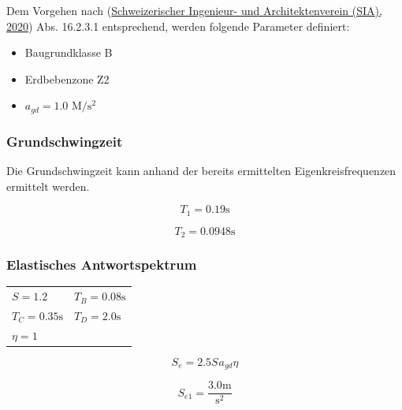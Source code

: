\documentclass[
  letterpaper,
  DIV=11]{scrreprt}
\providecommand{\tightlist}{%
  \setlength{\itemsep}{0pt}\setlength{\parskip}{0pt}}\usepackage{longtable,booktabs,array}
\begin{document}
Dem Vorgehen nach (\protect\hyperlink{ref-SIA261_2020}{Schweizerischer
Ingenieur- und Architektenverein (SIA), 2020}) Abs. 16.2.3.1
entsprechend, werden folgende Parameter definiert:

\begin{itemize}
\tightlist
\item
  Baugrundklasse B
\item
  Erdbebenzone Z2
\item
  \(a_{gd} = 1.0 \text{ M}/\text{s}^2\)
\end{itemize}

\hypertarget{grundschwingzeit-1}{%
\subsubsection{Grundschwingzeit}\label{grundschwingzeit-1}}

Die Grundschwingzeit kann anhand der bereits ermittelten
Eigenkreisfrequenzen ermittelt werden.

\begin{equation}T_{1} = 0.19 \text{s}\end{equation}

\begin{equation}T_{2} = 0.0948 \text{s}\end{equation}

\hypertarget{elastisches-antwortspektrum-3}{%
\subsubsection{Elastisches
Antwortspektrum}\label{elastisches-antwortspektrum-3}}

\begin{longtable}[]{@{}
  >{\raggedright\arraybackslash}p{}
  >{\raggedright\arraybackslash}p{}@{}}
\toprule\noalign{}
\endhead
\bottomrule\noalign{}
\endlastfoot
\(S = 1.2\) & \(T_{B} = 0.08 \text{s}\) \\
\(T_{C} = 0.35 \text{s}\) & \(T_{D} = 2.0 \text{s}\) \\
\(\eta = 1\) & \\
\end{longtable}

\begin{equation}S_{e} = 2.5 S_{} a_{gd} \eta\end{equation}

\begin{equation}S_{e 1} = \frac{3.0 \text{m}}{\text{s}^{2}}\end{equation}
\end{document}
